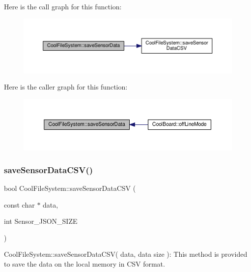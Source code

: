 Here is the call graph for this function\+:
\nopagebreak
\begin{figure}[H]
\begin{center}
\leavevmode
\includegraphics[width=350pt]{classCoolFileSystem_a4c560c2ddd40b74b7758e6ceb2c58957_cgraph}
\end{center}
\end{figure}
Here is the caller graph for this function\+:
\nopagebreak
\begin{figure}[H]
\begin{center}
\leavevmode
\includegraphics[width=350pt]{classCoolFileSystem_a4c560c2ddd40b74b7758e6ceb2c58957_icgraph}
\end{center}
\end{figure}
\mbox{\label{classCoolFileSystem_af5a51e2b9bb6e7e7edf75a508fe75f82}} 
\subsubsection{\texorpdfstring{save\+Sensor\+Data\+C\+S\+V()}{saveSensorDataCSV()}}
{\footnotesize\ttfamily bool Cool\+File\+System\+::save\+Sensor\+Data\+C\+SV (\begin{DoxyParamCaption}\item[{const char $\ast$}]{data,  }\item[{int}]{Sensor\+\_\+\+J\+S\+O\+N\+\_\+\+S\+I\+ZE }\end{DoxyParamCaption})}

Cool\+File\+System\+::save\+Sensor\+Data\+C\+S\+V( data, data size )\+: This method is provided to save the data on the local memory in C\+SV format.

